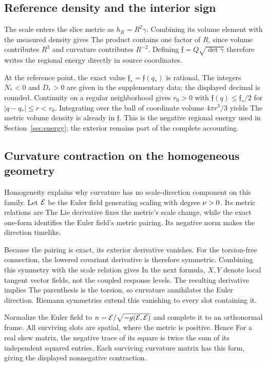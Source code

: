\subsection{Reference density and the interior sign}
\label{app:source-density}
The scale enters the slice metric as $h_R=R^2\gamma$. Combining its volume element with the measured density gives
\SourceDensityScalingDisplay
The product contains one factor of $R$, since volume contributes $R^3$ and curvature contributes $R^{-2}$. Defining $\mathfrak f=Q\sqrt{\det\gamma}$ therefore writes the regional energy directly in source coordinates.

At the reference point, the exact value $\mathfrak f_*=\mathfrak f(q_*)$ is rational,
\SourceDensityCoefficientDisplay
The integers $N_*<0$ and $D_*>0$ are given in the supplementary data; the displayed decimal is rounded. Continuity on a regular neighborhood gives $r_0>0$ with $\mathfrak f(q)\le\mathfrak f_*/2$ for $|q-q_*|\le r<r_0$. Integrating over the ball of coordinate volume $4\pi r^3/3$ yields
\SourceInteriorBoundDisplay
The metric volume density is already in $\mathfrak f$. This is the negative regional energy used in Section~\ref{sec:energy}; the exterior remains part of the complete accounting.

\subsection{Curvature contraction on the homogeneous geometry}
Homogeneity explains why curvature has no scale-direction component on this family. Let $\mathcal E$ be the Euler field generating scaling with degree $\nu>0$. Its metric relations are
\NativeHomothetyDisplay
The Lie derivative fixes the metric's scale change, while the exact one-form identifies the Euler field's metric pairing. Its negative norm makes the direction timelike.

Because the pairing is exact, its exterior derivative vanishes. For the torsion-free connection, the lowered covariant derivative is therefore symmetric. Combining this symmetry with the scale relation gives
\EnergyHomothetyExplanationDisplay
In the next formula, $X,Y$ denote local tangent vector fields, not the coupled response levels. The resulting derivative implies
\NativeEulerCurvatureDisplay
The parenthesis is the torsion, so curvature annihilates the Euler direction. Riemann symmetries extend this vanishing to every slot containing it.

Normalize the Euler field to $n=\mathcal E/\sqrt{-g(\mathcal E,\mathcal E)}$ and complete it to an orthonormal frame. All surviving slots are spatial, where the metric is positive. Hence
\NativeSpatialEnergyDisplay
For a real skew matrix,
\EnergySkewSquareExampleDisplay
the negative trace of its square is twice the sum of its independent squared entries. Each surviving curvature matrix has this form, giving the displayed nonnegative contraction.

